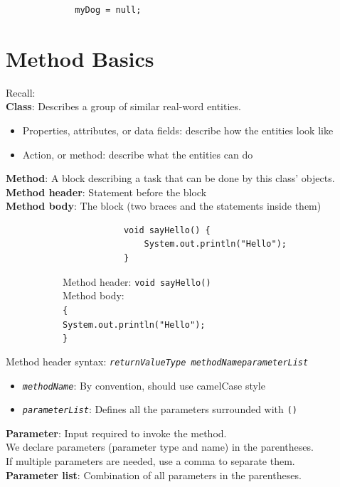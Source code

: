 \documentclass{article}
\begin{document}
\begin{figure}[h!]
	\centering
	\begin{verbatim}
		myDog = null;
	\end{verbatim}
\end{figure}
\newpage

\section{Method Basics}
Recall:\\
\textbf{Class}: Describes a group of similar real-word entities.
\begin{itemize}
	\item Properties, attributes, or data fields: describe how the entities look like
	\item Action, or method: describe what the entities can do
\end{itemize}
\textbf{Method}: A block describing a task that can be done by this class' objects.\\
\textbf{Method header}: Statement before the block\\
\textbf{Method body}: The block (two braces and the statements inside them)

\begin{figure}[h]
	\centering
	\begin{subfigure}[h]{.4\textwidth}
		\centering
		\begin{verbatim}
			void sayHello() {
			    System.out.println("Hello");
			}
		\end{verbatim}
	\end{subfigure}
	\begin{subfigure}[h]{.55\textwidth}
		Method header: \texttt{void sayHello()}\\
		Method body:\\
		\texttt{\{\\
			\hspace*{2em} System.out.println("Hello");\\
		\}}
	\end{subfigure}
\end{figure}

Method header syntax: \texttt{\textit{returnValueType} \textit{methodName}\textit{parameterList}}
\begin{itemize}
	\item \texttt{\textit{methodName}}: By convention, should use camelCase style
	\item \texttt{\textit{parameterList}}: Defines all the parameters surrounded with \texttt{()}
\end{itemize} 
\textbf{Parameter}: Input required to invoke the method.\\
We declare parameters (parameter type and name) in the parentheses.\\
If multiple parameters are needed, use a comma to separate them.\\
\textbf{Parameter list}: Combination of all parameters in the parentheses.
\end{document}
